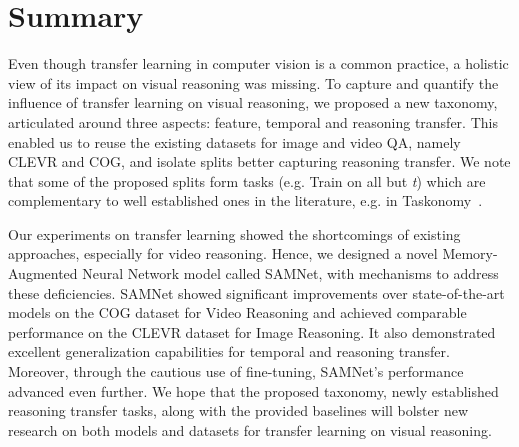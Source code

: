 \section{Summary}


Even though transfer learning in computer vision is a common practice, a holistic view of its impact on visual reasoning was missing.
To capture and quantify the influence of transfer learning on visual reasoning, we proposed a new taxonomy, articulated around three aspects: feature, temporal and reasoning transfer.  This enabled us to reuse the existing datasets for image and video QA, namely CLEVR and COG, and isolate splits better capturing reasoning transfer.
We note that some of the proposed splits form tasks (e.g. Train on all but \textit{t}) which are complementary to well established ones in the literature, e.g. in Taskonomy~\cite{zamir2018taskonomy}.

Our experiments on transfer learning showed the shortcomings of existing approaches, especially for video reasoning.  Hence, we designed a novel Memory-Augmented Neural Network model called SAMNet, with mechanisms to address these deficiencies.
SAMNet showed significant improvements over state-of-the-art models on the COG dataset for Video Reasoning  and achieved comparable performance on the CLEVR dataset for Image Reasoning.
It also demonstrated excellent generalization capabilities for temporal and reasoning transfer. Moreover, through the cautious use of fine-tuning, SAMNet's performance advanced even further.
We hope that the proposed taxonomy, newly established reasoning transfer tasks, along with the provided baselines will bolster new research on both models and datasets for transfer learning on visual reasoning.
